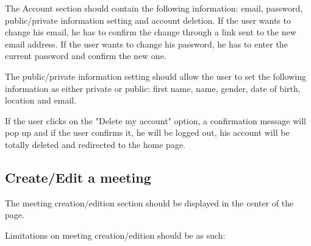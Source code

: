 \documentclass[conference]{IEEEtran}
\begin{document}
The Account section should contain the following information: email, password, public/private information setting and account deletion.
If the user wants to change his email, he has to confirm the change through a link sent to the new email address.
If the user wants to change his password, he has to enter the current password and confirm the new one.

The public/private information setting should allow the user to set the following information as either private or public: first name, name, gender, date of birth, location and email.

If the user clicks on the "Delete my account" option, a confirmation message will pop up and if the user confirms it, he will be logged out, his account will be totally deleted and redirected to the home page.

\subsection{Create/Edit a meeting}

The meeting creation/edition section should be displayed in the center of the page.

Limitations on meeting creation/edition should be as such:
\end{document}
